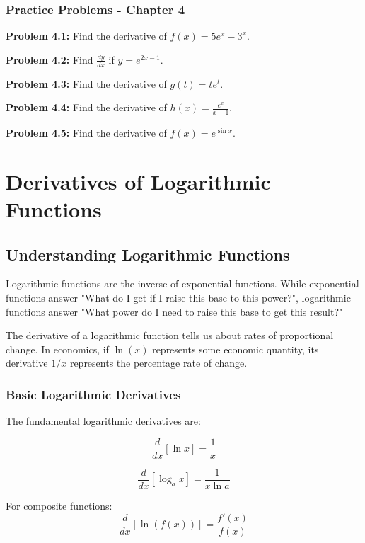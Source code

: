 \documentclass[12pt,a4paper]{book}
\theoremstyle{definition}
\begin{document}
\subsection{Practice Problems - Chapter 4}

\textbf{Problem 4.1:} Find the derivative of $f(x) = 5e^x - 3^x$.

\textbf{Problem 4.2:} Find $\frac{dy}{dx}$ if $y = e^{2x - 1}$.

\textbf{Problem 4.3:} Find the derivative of $g(t) = te^t$.

\textbf{Problem 4.4:} Find the derivative of $h(x) = \frac{e^x}{x + 1}$.

\textbf{Problem 4.5:} Find the derivative of $f(x) = e^{\sin x}$.

\chapter{Derivatives of Logarithmic Functions}

\section{Understanding Logarithmic Functions}

\begin{intuition}
Logarithmic functions are the inverse of exponential functions. While exponential functions answer "What do I get if I raise this base to this power?", logarithmic functions answer "What power do I need to raise this base to get this result?"

The derivative of a logarithmic function tells us about rates of proportional change. In economics, if $\ln(x)$ represents some economic quantity, its derivative $1/x$ represents the percentage rate of change.
\end{intuition}

\subsection{Basic Logarithmic Derivatives}

\begin{keyformula}
The fundamental logarithmic derivatives are:

$$\frac{d}{dx}[\ln x] = \frac{1}{x}$$

$$\frac{d}{dx}[\log_a x] = \frac{1}{x \ln a}$$

For composite functions:
$$\frac{d}{dx}[\ln(f(x))] = \frac{f'(x)}{f(x)}$$
\end{keyformula}
\end{document}
